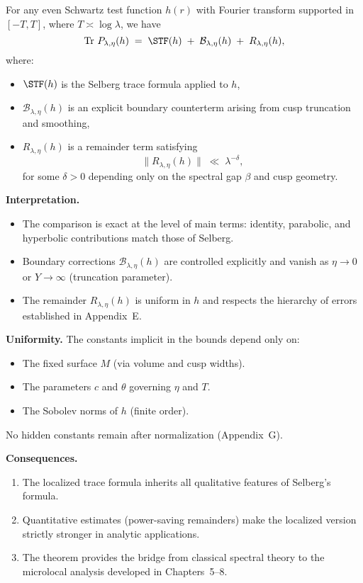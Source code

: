 \begin{theorem}
\label{thm:H:comparison}
For any even Schwartz test function $h(r)$ with Fourier transform supported in 
$[-T,T]$, where $T\asymp \log\lambda$, we have
\[
\operatorname{Tr}\,P_{\lambda,\eta}(h) \;=\; 
\STF(h) \;+\; \mathcal{B}_{\lambda,\eta}(h) \;+\; R_{\lambda,\eta}(h),
\]
where:
\begin{itemize}
  \item $\STF(h)$ is the Selberg trace formula applied to $h$,
  \item $\mathcal{B}_{\lambda,\eta}(h)$ is an explicit boundary counterterm 
        arising from cusp truncation and smoothing,
  \item $R_{\lambda,\eta}(h)$ is a remainder term satisfying
  \[
  \|R_{\lambda,\eta}(h)\| \;\ll\; \lambda^{-\delta},
  \]
  for some $\delta>0$ depending only on the spectral gap $\beta$ and cusp geometry.
\end{itemize}
\end{theorem}

\medskip
\noindent\textbf{Interpretation.}
\begin{itemize}
  \item The comparison is exact at the level of main terms: identity, parabolic, 
        and hyperbolic contributions match those of Selberg.
  \item Boundary corrections $\mathcal{B}_{\lambda,\eta}(h)$ are controlled 
        explicitly and vanish as $\eta\to 0$ or $Y\to\infty$ (truncation parameter).
  \item The remainder $R_{\lambda,\eta}(h)$ is uniform in $h$ and respects the 
        hierarchy of errors established in Appendix~E.
\end{itemize}

\medskip
\noindent\textbf{Uniformity.}
The constants implicit in the bounds depend only on:
\begin{itemize}
  \item The fixed surface $M$ (via volume and cusp widths).
  \item The parameters $c$ and $\theta$ governing $\eta$ and $T$.
  \item The Sobolev norms of $h$ (finite order).
\end{itemize}
No hidden constants remain after normalization (Appendix~G).

\medskip
\noindent\textbf{Consequences.}
\begin{enumerate}
  \item The localized trace formula inherits all qualitative features of Selberg’s formula.
  \item Quantitative estimates (power-saving remainders) make the localized version 
        strictly stronger in analytic applications.
  \item The theorem provides the bridge from classical spectral theory to the 
        microlocal analysis developed in Chapters~5–8.
\end{enumerate}

